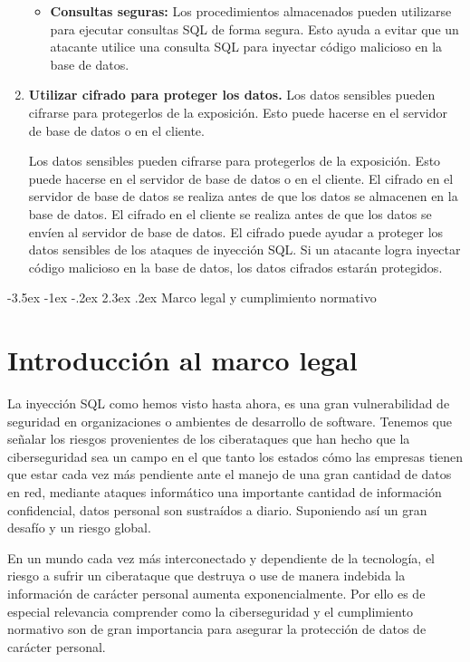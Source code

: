 \documentclass[11pt]{report}
\makeatletter
\renewcommand\chapter{\@startsection{chapter}{0}{\z@}%
    {-3.5ex \@plus -1ex \@minus -.2ex}%
    {2.3ex \@plus.2ex}%
    {\normalfont\Large\bfseries}}
\makeatother
\begin{document}
\begin{enumerate}
\begin{itemize}
    \item \textbf{Consultas seguras:} Los procedimientos almacenados pueden utilizarse para ejecutar consultas SQL de forma segura. Esto
    ayuda a evitar que un atacante utilice una consulta SQL para inyectar código malicioso en la base de datos.
  \end{itemize}

  \item \textbf{Utilizar cifrado para proteger los datos.} Los datos sensibles pueden cifrarse para protegerlos de la exposición. Esto puede
  hacerse en el servidor de base de datos o en el cliente.

  Los datos sensibles pueden cifrarse para protegerlos de la exposición. Esto puede hacerse en el servidor de base de datos o en el cliente.
  El cifrado en el servidor de base de datos se realiza antes de que los datos se almacenen en la base de datos. El cifrado en el cliente se
  realiza antes de que los datos se envíen al servidor de base de datos. El cifrado puede ayudar a proteger los datos sensibles de los ataques
  de inyección SQL. Si un atacante logra inyectar código malicioso en la base de datos, los datos cifrados estarán protegidos.
\end{enumerate}

\cleardoublepage

\chapter{Marco legal y cumplimiento normativo}
\section{Introducción al marco legal}
La inyección SQL como hemos visto hasta ahora, es una gran vulnerabilidad de seguridad en organizaciones o ambientes de desarrollo de software. 
Tenemos que señalar los riesgos provenientes de los ciberataques que han hecho que  la ciberseguridad sea un campo en el que tanto los estados 
cómo las empresas tienen que estar cada vez más pendiente ante el manejo de una gran cantidad de datos en red, mediante ataques informático una
importante cantidad de información confidencial, datos personal son sustraídos a diario. Suponiendo así un gran desafío y un riesgo global.

En un mundo cada vez más interconectado y dependiente de la tecnología, el riesgo a sufrir un ciberataque que destruya o use de manera indebida
la información de carácter personal aumenta exponencialmente. Por ello es de especial relevancia comprender como la ciberseguridad y el cumplimiento
normativo son de gran importancia para asegurar la protección de datos de carácter personal.
\end{document}
